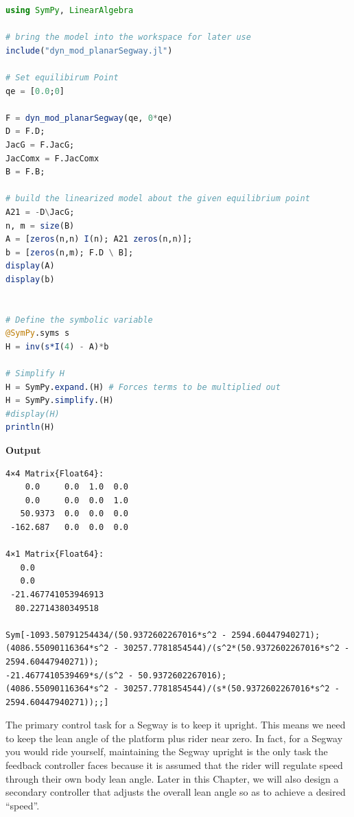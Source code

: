 \begin{lstlisting}[language=Julia,style=mystyle]
using SymPy, LinearAlgebra

# bring the model into the workspace for later use
include("dyn_mod_planarSegway.jl") 

# Set equilibirum Point
qe = [0.0;0]

F = dyn_mod_planarSegway(qe, 0*qe)
D = F.D; 
JacG = F.JacG; 
JacComx = F.JacComx
B = F.B; 

# build the linearized model about the given equilibrium point
A21 = -D\JacG;  
n, m = size(B)
A = [zeros(n,n) I(n); A21 zeros(n,n)];
b = [zeros(n,m); F.D \ B];
display(A)
display(b)


# Define the symbolic variable
@SymPy.syms s 
H = inv(s*I(4) - A)*b

# Simplify H
H = SymPy.expand.(H) # Forces terms to be multiplied out
H = SymPy.simplify.(H)
#display(H)
println(H)
\end{lstlisting}
\textbf{Output} 
\begin{verbatim}
4×4 Matrix{Float64}:
    0.0     0.0  1.0  0.0
    0.0     0.0  0.0  1.0
   50.9373  0.0  0.0  0.0
 -162.687   0.0  0.0  0.0
 
4×1 Matrix{Float64}:
   0.0
   0.0
 -21.467741053946913
  80.22714380349518
  
Sym[-1093.50791254434/(50.9372602267016*s^2 - 2594.60447940271); 
(4086.55090116364*s^2 - 30257.7781854544)/(s^2*(50.9372602267016*s^2 - 2594.60447940271)); 
-21.4677410539469*s/(s^2 - 50.9372602267016); 
(4086.55090116364*s^2 - 30257.7781854544)/(s*(50.9372602267016*s^2 - 2594.60447940271));;]
\end{verbatim}
\Qed




\vspace*{.2cm}
The primary control task for a Segway is to keep it upright. This means we need to keep the lean angle of the platform plus rider near zero. In fact, for a Segway you would ride yourself, maintaining the Segway upright is the only task the feedback controller faces because it is assumed that the rider will regulate speed through their own body lean angle. Later in this Chapter, we will also design a secondary controller that adjusts the overall lean angle so as to achieve a desired ``speed''. 

